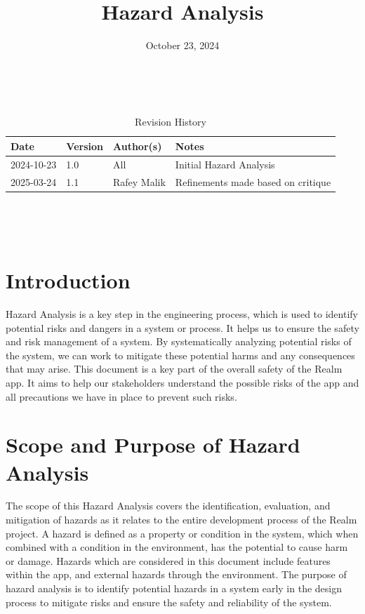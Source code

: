 \documentclass{article}
\title{Hazard Analysis\\\progname}
\author{\authname}
\date{October 23, 2024}
\begin{document}
\maketitle
\thispagestyle{empty}

~\newpage


\begin{table}[hp]
    \caption{Revision History} \label{rev_history_table}
    \begin{tabularx}{\textwidth}{p{3cm}p{2cm}p{3cm}X}
        \toprule {\textbf{Date}} & {\textbf{Version}} & {\textbf{Author(s)}} & {\textbf{Notes}} \\
        \midrule
        2024-10-23               & 1.0         & All      & Initial Hazard Analysis      \\
        \midrule
        2025-03-24               & 1.1         & Rafey Malik      & Refinements made based on critique      \\
        \bottomrule
    \end{tabularx}
\end{table}

~\newpage

\tableofcontents

~\newpage


\section{Introduction}

Hazard Analysis is a key step in the engineering process, which is used to identify potential risks and dangers in a system or process. It helps us to ensure the safety and risk management of a system. By systematically analyzing potential risks of the system, we can work to mitigate these potential harms and any consequences that may arise. This document is a key part of the overall safety of the Realm app. It aims to help our stakeholders understand the possible risks of the app and all precautions we have in place to prevent such risks.

\section{Scope and Purpose of Hazard Analysis}

The scope of this Hazard Analysis covers the identification, evaluation, and mitigation of hazards as it relates to the entire development process of the Realm project. A hazard is defined as a property or condition in the system, which when combined with a condition in the environment, has the potential to cause harm or damage. Hazards which are considered in this document include features within the app, and external hazards through the environment. The purpose of hazard analysis is to identify potential hazards in a system early in the design process to mitigate risks and ensure the safety and reliability of the system. \\
\end{document}
